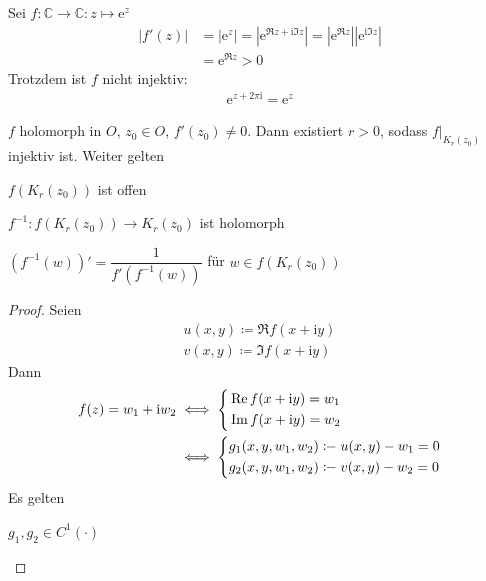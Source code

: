 \documentclass[a4paper,10pt]{scrbook}
\begin{document}
\begin{example}
  Sei $f : \mathbb{C} \to \mathbb{C} : z \mapsto \mathrm{e}^z$
  \begin{align*}
    |f'(z)| &= |\mathrm{e}^z| = \left| \mathrm{e}^{\Re z + \mathrm{i} \Im z} \right| = \left| \mathrm{e}^{\Re z} \right| \left| \mathrm{e}^{\mathrm{i} \Im z} \right| \\
    &= \mathrm{e}^{\Re z} > 0
  \end{align*}
  Trotzdem ist $f$ nicht injektiv:
  \begin{align*}
    \mathrm{e}^{z + 2 \pi \mathrm{i}} = \mathrm{e}^z
  \end{align*}
\end{example}

\begin{theorem} \label{thm:3.6}
  $f$ holomorph in $O$, $z_0 \in O$, $f'(z_0) \neq 0$. Dann existiert $r > 0$, sodass $f\Big|_{K_r(z_0)}$ injektiv ist. Weiter gelten
  \begin{item-triangle}
    \item $f(K_r(z_0))$ ist offen

    \item $f^{-1} : f(K_r(z_0)) \to K_r(z_0)$ ist holomorph

    \item $(f^{-1}(w))' = \dfrac{1}{f'(f^{-1}(w))}$ für $w \in f(K_r(z_0))$
  \end{item-triangle}

  \begin{proof}
    Seien
    \begin{align*}
      u(x,y) \coloneq \Re f(x+\mathrm{i}y) \\
      v(x,y) \coloneq \Im f(x+\mathrm{i}y)
    \end{align*}
    Dann
    \begin{align*}
      f(z) = w_1 + \mathrm{i} w_2 &\iff
      \begin{dcases}
        \Re f(x+\mathrm{i}y) = w_1 \\
        \Im f(x+\mathrm{i}y) = w_2
      \end{dcases}
      \\
      &\iff
      \begin{dcases}
        g_1(x,y,w_1,w_2) \coloneq u(x,y) - w_1 = 0 \\
        g_2(x,y,w_1,w_2) \coloneq v(x,y) - w_2 = 0
      \end{dcases}
    \end{align*}
    Es gelten
    \begin{enum-arab}
      \item $g_1,g_2 \in C^1(\cdot)$


\end{enum-arab}
\end{proof}
\end{theorem}
\end{document}
